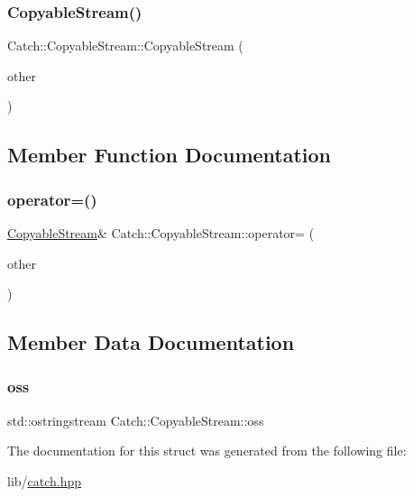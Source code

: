 \hypertarget{struct_catch_1_1_copyable_stream_a0e72dc16240653f52c17106f4bf34da8}{}\label{struct_catch_1_1_copyable_stream_a0e72dc16240653f52c17106f4bf34da8} 
\subsubsection{\texorpdfstring{Copyable\+Stream()}{CopyableStream()}\hspace{0.1cm}{\footnotesize\ttfamily [2/2]}}
{\footnotesize\ttfamily Catch\+::\+Copyable\+Stream\+::\+Copyable\+Stream (\begin{DoxyParamCaption}\item[{\hyperlink{struct_catch_1_1_copyable_stream}{Copyable\+Stream} const \&}]{other }\end{DoxyParamCaption})\hspace{0.3cm}{\ttfamily [inline]}}



\subsection{Member Function Documentation}
\hypertarget{struct_catch_1_1_copyable_stream_a1760fa29b38011c5845171260bec0966}{}\label{struct_catch_1_1_copyable_stream_a1760fa29b38011c5845171260bec0966} 
\subsubsection{\texorpdfstring{operator=()}{operator=()}}
{\footnotesize\ttfamily \hyperlink{struct_catch_1_1_copyable_stream}{Copyable\+Stream}\& Catch\+::\+Copyable\+Stream\+::operator= (\begin{DoxyParamCaption}\item[{\hyperlink{struct_catch_1_1_copyable_stream}{Copyable\+Stream} const \&}]{other }\end{DoxyParamCaption})\hspace{0.3cm}{\ttfamily [inline]}}



\subsection{Member Data Documentation}
\hypertarget{struct_catch_1_1_copyable_stream_ae123fb4d673e7d7a13a3c5f6bc5d426c}{}\label{struct_catch_1_1_copyable_stream_ae123fb4d673e7d7a13a3c5f6bc5d426c} 
\subsubsection{\texorpdfstring{oss}{oss}}
{\footnotesize\ttfamily std\+::ostringstream Catch\+::\+Copyable\+Stream\+::oss}



The documentation for this struct was generated from the following file\+:\begin{DoxyCompactItemize}
\item 
lib/\hyperlink{catch_8hpp}{catch.\+hpp}\end{DoxyCompactItemize}
